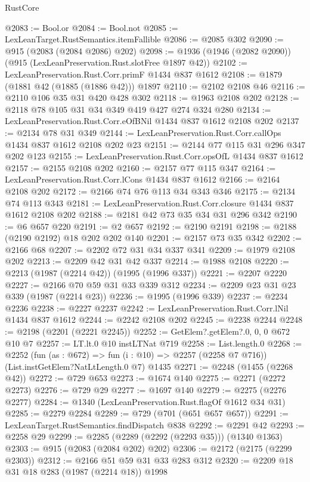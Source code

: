 \begin{lexlean}{RustCore}
\begin{coremodule}
@2083 := Bool.or
@2084 := Bool.not
@2085 := LexLeanTarget.RustSemantics.itemFallible
@2086 := @2085 @302
@2090 := @915 (@2083 (@2084 @2086) @202)
@2098 := @1936 (@1946 (@2082 @2090)) (@915 (LexLeanPreservation.Rust.slotFree @1897 @42))
@2102 := LexLeanPreservation.Rust.Corr.primF @1434 @837 @1612
@2108 := @1879 (@1881 @42 (@1885 (@1886 @42))) @1897
@2110 := @2102 @2108 @46
@2116 := @2110 @106 @35 @31 @420 @428 @302
@2118 := @1963 @2108 @202
@2128 := @2118 @78 @105 @31 @34 @349 @419 @427 @274 @324 @280
@2134 := LexLeanPreservation.Rust.Corr.eOfBNil @1434 @837 @1612 @2108 @202
@2137 := @2134 @78 @31 @349
@2144 := LexLeanPreservation.Rust.Corr.callOps @1434 @837 @1612 @2108 @202 @23
@2151 := @2144 @77 @115 @31 @296 @347 @202 @123
@2155 := LexLeanPreservation.Rust.Corr.opsOfL @1434 @837 @1612
@2157 := @2155 @2108 @202
@2160 := @2157 @77 @115 @347
@2164 := LexLeanPreservation.Rust.Corr.lCons @1434 @837 @1612
@2166 := @2164 @2108 @202
@2172 := @2166 @74 @76 @113 @34 @343 @346
@2175 := @2134 @74 @113 @343
@2181 := LexLeanPreservation.Rust.Corr.closure @1434 @837 @1612 @2108 @202
@2188 := @2181 @42 @73 @35 @34 @31 @296 @342
@2190 := @6 @657 @220
@2191 := @2 @657
@2192 := @2190 @2191
@2198 := @2188 (@2190 @2192) @18 @202 @202 @140
@2201 := @2157 @73 @35 @342
@2202 := @2166 @68
@2207 := @2202 @72 @31 @34 @337 @341
@2209 := @1979 @2108 @202
@2213 := @2209 @42 @31 @42 @337
@2214 := @1988 @2108
@2220 := @2213 (@1987 (@2214 @42)) (@1995 (@1996 @337))
@2221 := @2207 @2220
@2227 := @2166 @70 @59 @31 @33 @339 @312
@2234 := @2209 @23 @31 @23 @339 (@1987 (@2214 @23))
@2236 := @1995 (@1996 @339)
@2237 := @2234 @2236
@2238 := @2227 @2237
@2242 := LexLeanPreservation.Rust.Corr.lNil @1434 @837 @1612
@2244 := @2242 @2108 @202
@2245 := @2238 @2244
@2248 := @2198 (@2201 (@2221 @2245))
@2252 := GetElem?.getElem?.{0, 0, 0} @672 @10 @7
@2257 := LT.lt.{0} @10 instLTNat @719
@2258 := List.length.{0}
@2268 := @2252
    (fun (as : @672) => fun (i : @10) => @2257 (@2258 @7 @716))
    (List.instGetElem?NatLtLength.{0} @7)
    @1435
@2271 := @2248 (@1455 (@2268 @42))
@2272 := @729 @653
@2273 := @1674 @140
@2275 := @2271 (@2272 @2273)
@2276 := @729 @29
@2277 := @1697 @140
@2279 := @2275 (@2276 @2277)
@2284 := @1340 (LexLeanPreservation.Rust.flagOf @1612 @34 @31)
@2285 := @2279 @2284
@2289 := @729 (@701 (@651 @657 @657))
@2291 := LexLeanTarget.RustSemantics.findDispatch @838
@2292 := @2291 @42
@2293 := @2258 @29
@2299 := @2285 (@2289 (@2292 (@2293 @35))) (@1340 @1363)
@2303 := @915 (@2083 (@2084 @202) @202)
@2306 := @2172 (@2175 (@2299 @2303))
@2312 := @2166 @51 @59 @31 @33 @283 @312
@2320 := @2209 @18 @31 @18 @283 (@1987 (@2214 @18)) @1998

\end{coremodule}
\end{lexlean}
